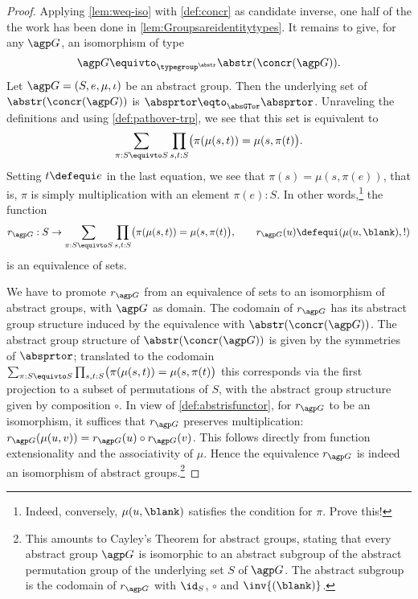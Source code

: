 \begin{proof}
Applying \cref{lem:weq-iso} with \cref{def:concr} as 
candidate inverse, one half of the the work has been done 
in \cref{lem:Groupsareidentitytypes}. It remains to give,
for any ${\agp G}$, an isomorphism of type
\[
{\agp G}\equivto_{\typegroup^{\abstr}}\abstr(\concr({\agp G})).
\]
Let ${\agp G}=(S,e,\mu,\iota)$ be an abstract group.
Then the underlying set of $\abstr(\concr({\agp G}))$ is 
$\absprtor \eqto_{\absGTor}\absprtor$.
Unraveling the definitions and using \cref{def:pathover-trp},
we see that this set is equivalent to
\[
\sum_{\pi:S\equivto S}\prod_{s,t:S}\bigl(\pi(\mu(s,t))=\mu(s,\pi(t)\bigr).
\]
Setting $t\defequi e$ in the last equation, we see that $\pi(s)=\mu(s,\pi(e))$,
that is, $\pi$ is simply multiplication with an element $\pi(e):S$.
In other words,\footnote{Indeed, conversely, $\mu(u,\blank)$
satisfies the condition for $\pi$. Prove this!}
the function
\[
r_{\agp G}:S\to  \sum_{\pi:S\equivto S}\prod_{s,t:S}
\bigl(\pi(\mu(s,t))=\mu(s,\pi(t)\bigr),
\qquad r_{\agp G}(u)\defequi(\mu(u,\blank),!)
\]
is an equivalence of sets.

We have to promote $r_{\agp G}$ from an equivalence of sets to
an isomorphism of abstract groups, with $\agp G$ as domain.
The codomain of $r_{\agp G}$ has its abstract group structure induced by
the equivalence with $\abstr(\concr({\agp G}))$.
The abstract group structure of $\abstr(\concr({\agp G}))$ is given by 
the symmetries of $\absprtor$; translated to the codomain
$\sum_{\pi:S\equivto S}\prod_{s,t:S}\bigl(\pi(\mu(s,t))=\mu(s,\pi(t)\bigr)$ 
this corresponds via the first projection to a subset of permutations of $S$,
with the abstract group structure given by composition $\circ$.
In view of \cref{def:abstrisfunctor}, for $r_{\agp G}$ to be an isomorphism,
it suffices that $r_{\agp G}$ preserves multiplication:
$r_{\agp G}(\mu(u,v))=r_{\agp G}(u)\circ r_{\agp G}(v)$.
This follows directly from function extensionality and 
the associativity of $\mu$. Hence the equivalence $r_{\agp G}$ is 
indeed an isomorphism of abstract groups.\footnote{%
 \label{ft:abstract-Cayley}
 This amounts to Cayley's Theorem for abstract groups,
 stating that every abstract group $\agp G$ is isomorphic to an 
 abstract subgroup of the abstract permutation group of the underlying 
 set $S$ of $\agp G$. The abstract subgroup is the codomain of $r_{\agp G}$
 with $\id_S$, $\circ$ and $\inv{(\blank)}$.
}\qedhere
\end{proof}



